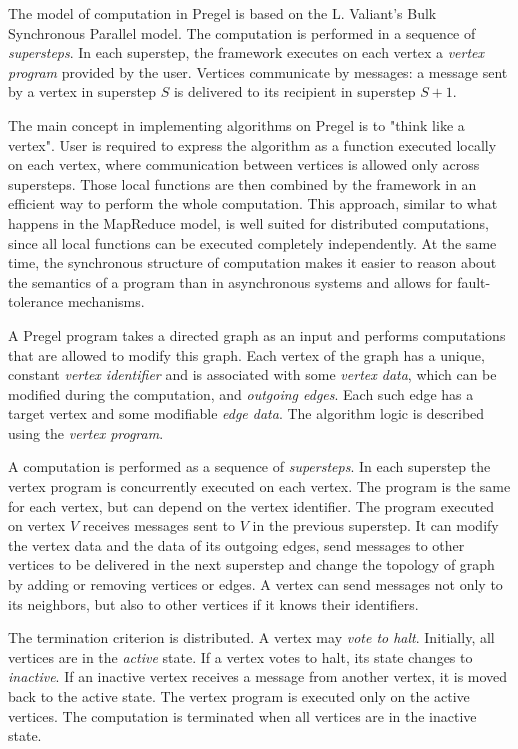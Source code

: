 \documentclass{pracamgr}
\theoremstyle{plain}
\theoremstyle{definition}
\theoremstyle{remark}
\begin{document}
The model of computation in Pregel is based on the L. Valiant's Bulk Synchronous Parallel model. The computation is performed in a sequence of \emph{supersteps}. In each superstep, the framework executes on each vertex a \emph{vertex program} provided by the user. Vertices communicate by messages: a message sent by a vertex in superstep $S$ is delivered to its recipient in superstep $S+1$.

The main concept in implementing algorithms on Pregel is to "think like a vertex". User is required to express the algorithm as a function executed locally on each vertex, where communication between vertices is allowed only across supersteps. Those local functions are then combined by the framework in an efficient way to perform the whole computation. This approach, similar to what happens in the MapReduce model, is well suited for distributed computations, since all local functions can be executed completely independently. At the same time, the synchronous structure of computation makes it easier to reason about the semantics of a program than in asynchronous systems and allows for fault-tolerance mechanisms.

A Pregel program takes a directed graph as an input and performs computations that are allowed to modify this graph.
Each vertex of the graph has a unique, constant \emph{vertex identifier} and is associated with some \emph{vertex data}, which can be modified during the computation, and \emph{outgoing edges}. Each such edge has a target vertex and some modifiable \emph{edge data}. The algorithm logic is described using the \emph{vertex program}.

A computation is performed as a sequence of \emph{supersteps}. In each superstep the vertex program is concurrently executed on each vertex. The program is the same for each vertex, but can depend on the vertex identifier. The program executed on vertex $V$ receives messages sent to $V$ in the previous superstep. It can modify the vertex data and the data of its outgoing edges, send messages to other vertices to be delivered in the next superstep and change the topology of graph by adding or removing vertices or edges. A vertex can send messages not only to its neighbors, but also to other vertices if it knows their identifiers.

The termination criterion is distributed. A vertex may \emph{vote to halt}. Initially, all vertices are in the \emph{active} state. If a vertex votes to halt, its state changes to \emph{inactive}. If an inactive vertex receives a message from another vertex, it is moved back to the active state. The vertex program is executed only on the active vertices. The computation is terminated when all vertices are in the inactive state.
\end{document}
